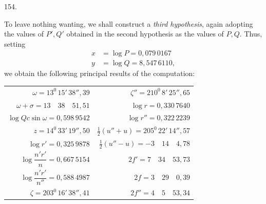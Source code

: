 \par{}\medskip
\hypertarget{native-208-article154}{}
\begin{center}154.\end{center}
To leave nothing wanting, we shall construct a \textit{third hypothesis}, again adopting the values of $P',Q'$ obtained in the second hypothesis as the values of $P,Q$. Thus, setting
\[
\begin{aligned}
x&=\log P=0{,}079\,0167\\
y&=\log Q=8{,}547\,6110,
\end{aligned}
\]
we obtain the following principal results of the computation:
\begin{center}\small\setlength{\tabcolsep}{6pt}
\begin{tabular}{@{}r|r@{}}
$\omega=13^{0}\,15'\,38''{,}39$ & $\zeta''=210^{0}\,8'\,25''{,}65$\\[.5em]
$\omega+\sigma=13\quad38\quad51{,}51$ & $\log r=0{,}330\,7640$\\[.5em]
$\log Qc\sin\omega=0{,}598\,9542$ & $\log r''=0{,}322\,2239$\\[.5em]
$z=14^{0}\,33'\,19''{,}50$ & $\tfrac12(u''+u)=205^{0}\,22'\,14''{,}57$\\[.5em]
$\log r'=0{,}325\,9878$ & $\tfrac12(u''-u)=-3\quad14\quad4{,}78$\\[.5em]
$\log\dfrac{n'r'}{n}=0{,}667\,5154$ & $2f'=7\quad34\quad53{,}73$\\[.7em]
$\log\dfrac{n'r'}{n''}=0{,}588\,4987$ & $2f=3\quad29\quad0{,}39$\\[.7em]
$\zeta=203^{0}\,16'\,38''{,}41$ & $2f''=4\quad5\quad53{,}34$
\end{tabular}
\end{center}

